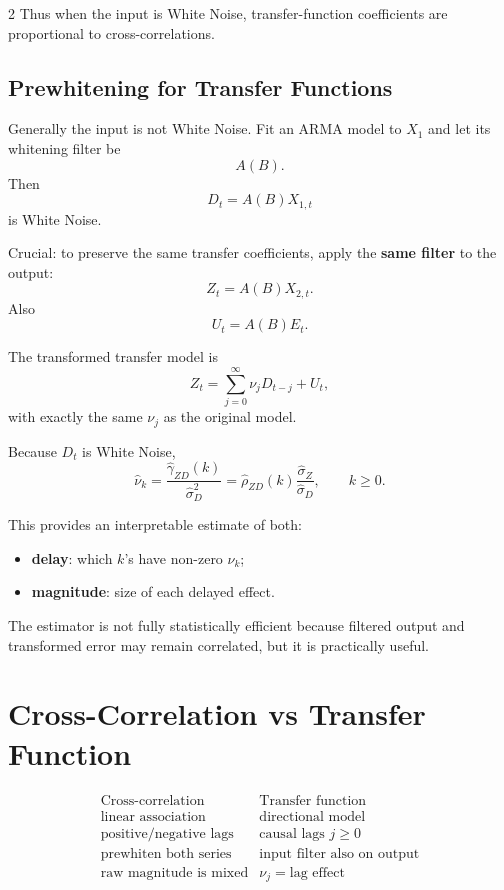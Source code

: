 \documentclass[9pt,a4paper]{extarticle}
\newcommand{\key}[1]{\textbf{#1}}
\begin{document}
\begin{multicols}{2}
Thus when the input is White Noise, transfer-function coefficients are proportional to cross-correlations.

\subsection{Prewhitening for Transfer Functions}

Generally the input is not White Noise. Fit an ARMA model to \(X_1\) and let its whitening filter be
\[
A(B).
\]
Then
\[
D_t=A(B)X_{1,t}
\]
is White Noise.

Crucial: to preserve the same transfer coefficients, apply the \key{same filter} to the output:
\[
\boxed{
Z_t=A(B)X_{2,t}.
}
\]
Also
\[
U_t=A(B)E_t.
\]

The transformed transfer model is
\[
\boxed{
Z_t=
\sum_{j=0}^{\infty}\nu_jD_{t-j}+U_t,
}
\]
with exactly the same \(\nu_j\) as the original model.

Because \(D_t\) is White Noise,
\[
\boxed{
\widehat\nu_k
=
\frac{\widehat\gamma_{ZD}(k)}
{\widehat\sigma_D^2}
=
\widehat\rho_{ZD}(k)
\frac{\widehat\sigma_Z}{\widehat\sigma_D},
\qquad k\ge0.
}
\]

This provides an interpretable estimate of both:
\begin{itemize}
\item \key{delay}: which \(k\)'s have non-zero \(\nu_k\);
\item \key{magnitude}: size of each delayed effect.
\end{itemize}

The estimator is not fully statistically efficient because filtered output and transformed error may remain correlated, but it is practically useful.

\section{Cross-Correlation vs Transfer Function}

\[
\boxed{
\begin{array}{c|c}
\text{Cross-correlation} & \text{Transfer function}\\ \hline
\text{linear association} & \text{directional model}\\
\text{positive/negative lags} & \text{causal lags }j\ge0\\
\text{prewhiten both series} & \text{input filter also on output}\\
\text{raw magnitude is mixed} & \nu_j=\text{lag effect}
\end{array}}
\]


\end{multicols}
\end{document}
